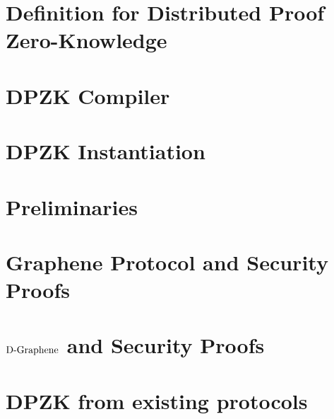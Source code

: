 \documentclass[USenglish,oneside,twocolumn]{article}
\begin{document}
\section{Definition for Distributed Proof Zero-Knowledge}
\label{sec:security model}

\section{DPZK Compiler}
\label{sec:compiler}

\section{DPZK Instantiation}
\label{sec:instantiations}





%
\appendix
\section{Preliminaries}
\label{app:securitydef}

\section{Graphene Protocol and Security Proofs}
\label{app:grapehene_securityproofs}

\section{$\text{D-Graphene}$ and Security Proofs}
\label{app:dp_grapehene_securityproofs}

\section{DPZK from existing protocols}
\label{app:dpzk_others}

\section*{ }
\label{app:DP_Protocols}

\end{document}
